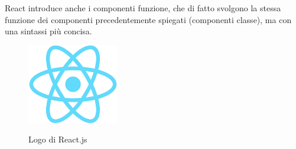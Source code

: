 \noindent React introduce anche i componenti funzione, che di fatto svolgono la stessa funzione dei componenti precedentemente spiegati (componenti classe), ma con una sintassi più concisa.

\begin{figure}[H]
    \caption{Logo di React.js ~\cite{React:online}}
    \centering
    \includegraphics[width=40mm]{img/logos/react_logo.png}
    \label{fig:react_logo}
\end{figure}
